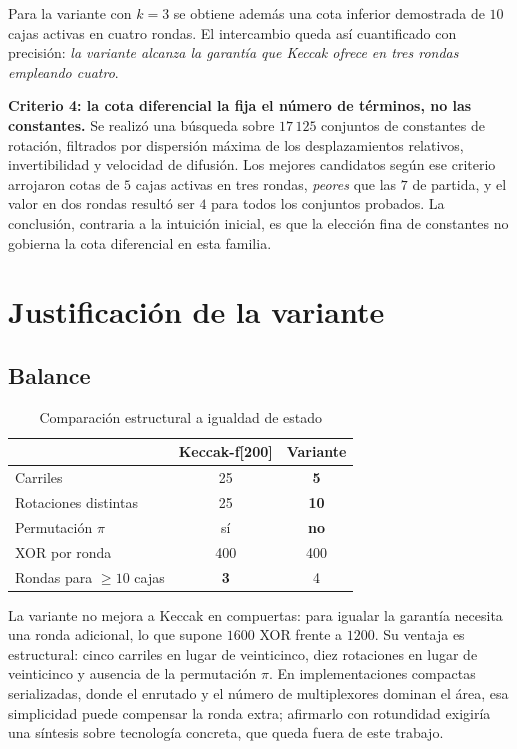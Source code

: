 \documentclass[conference]{IEEEtran}
\begin{document}
Para la variante con $k=3$ se obtiene además una cota inferior demostrada de $10$
cajas activas en cuatro rondas. El intercambio queda así cuantificado con
precisión: \emph{la variante alcanza la garantía que Keccak ofrece en tres rondas
empleando cuatro}.

\textbf{Criterio 4: la cota diferencial la fija el número de términos, no las
constantes.} Se realizó una búsqueda sobre $17\,125$ conjuntos de constantes de
rotación, filtrados por dispersión máxima de los desplazamientos relativos,
invertibilidad y velocidad de difusión. Los mejores candidatos según ese criterio
arrojaron cotas de $5$ cajas activas en tres rondas, \emph{peores} que las $7$ de
partida, y el valor en dos rondas resultó ser $4$ para todos los conjuntos
probados. La conclusión, contraria a la intuición inicial, es que la elección fina
de constantes no gobierna la cota diferencial en esta familia.

\section{Justificación de la variante}

\subsection{Balance}

\begin{table}[t]
\caption{Comparación estructural a igualdad de estado}
\label{tab:balance}
\centering
\begin{tabular}{@{}lcc@{}}
\toprule
 & Keccak-f[200] & Variante \\
\midrule
Carriles                        & 25   & \textbf{5} \\
Rotaciones distintas            & 25   & \textbf{10} \\
Permutación $\pi$               & sí   & \textbf{no} \\
XOR por ronda                   & 400  & 400 \\
Rondas para $\ge 10$ cajas      & \textbf{3} & 4 \\
\bottomrule
\end{tabular}
\end{table}

La variante no mejora a Keccak en compuertas: para igualar la garantía necesita
una ronda adicional, lo que supone $1600$ XOR frente a $1200$. Su ventaja es
estructural: cinco carriles en lugar de veinticinco, diez rotaciones en lugar de
veinticinco y ausencia de la permutación $\pi$. En implementaciones compactas
serializadas, donde el enrutado y el número de multiplexores dominan el área, esa
simplicidad puede compensar la ronda extra; afirmarlo con rotundidad exigiría una
síntesis sobre tecnología concreta, que queda fuera de este trabajo.
\end{document}

